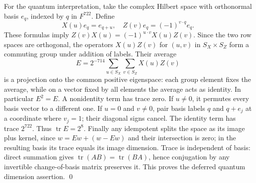 \documentclass{article}
\DeclareMathOperator{\tr}{tr}
\begin{document}
For the quantum interpretation, take the complex Hilbert space with orthonormal basis
\(e_q\), indexed by \(q\) in \(F^{722}\). Define
\begin{equation}
  X(u) e_q = e_{q+u}, \quad Z(v) e_q = (-1)^{v \cdot q} e_q.
\end{equation}
These formulas imply \(Z(v) X(u) = (-1)^{u \cdot v} X(u) Z(v)\). Since the two row spaces
are orthogonal, the operators \(X(u) Z(v)\) for \((u, v)\) in \(S_X \times S_Z\) form a
commuting group under addition of labels. Their average
\begin{equation}
  E = 2^{-714} \sum_{u \in S_X} \sum_{v \in S_Z} X(u) Z(v)
\end{equation}
is a projection onto the common positive eigenspace: each group element fixes the
average, while on a vector fixed by all elements the average acts as identity. In
particular \(E^2 = E\). A nonidentity term has trace zero. If \(u \ne 0\), it permutes
every basis vector to a different one. If \(u = 0\) and \(v \ne 0\), pair basis labels
\(q\) and \(q + e_j\) at a coordinate where \(v_j = 1\); their diagonal signs cancel. The
identity term has trace \(2^{722}\). Thus \(\tr E = 2^8\). Finally any idempotent splits
the space as its image plus kernel, since \(w = Ew + (w - Ew)\) and their intersection is
zero; in the resulting basis its trace equals its image dimension. Trace is independent of
basis: direct summation gives \(\tr(AB) = \tr(BA)\), hence conjugation by any invertible
change-of-basis matrix preserves it. This proves the deferred quantum dimension
assertion. \qed
\end{document}

